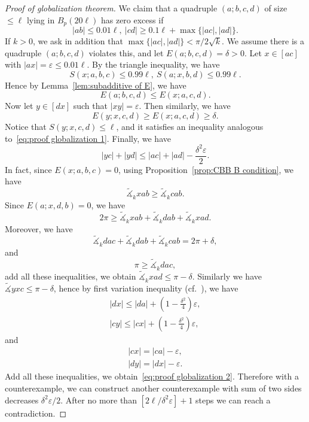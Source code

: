 \begin{proof}[Proof of globalization theorem]
    We claim that a quadruple $(a;b,c,d)$ of size $\leq\ell$ lying in $B_p(20\ell)$ has zero excess if
    \begin{equation}
        |ab|\leq 0.01\ell,\ |cd|\geq 0.1\ell+\max\{|ac|,|ad|\}.\label{eq:proof globalization 1}
    \end{equation}
    If $k>0$, we ask in addition that $\max\{|ac|,|ad|\}<\pi/2\sqrt{k}$.
    We assume there is a quadruple $(a;b,c,d)$ violates this, and let $E(a;b,c,d)=\delta>0$.
    Let $x\in[ac]$ with $|ax|=\varepsilon\leq 0.01\ell$.
    By the triangle inequality, we have
    \[S(x;a,b,c)\leq 0.99\ell,\ S(a;x,b,d)\leq 0.99\ell.\]
    Hence by Lemma~\ref{lem:subadditive of E}, we have
    \[E(a;b,c,d)\leq E(x;a,c,d).\]
    Now let $y\in[dx]$ such that $|xy|=\varepsilon$.
    Then similarly, we have
    \[E(y;x,c,d)\geq E(x;a,c,d)\geq\delta.\]
    Notice that $S(y;x,c,d)\leq\ell$, and it satisfies an inequality analogous to~\eqref{eq:proof globalization 1}.
    Finally, we have
    \begin{equation}
        |yc|+|yd|\leq|ac|+|ad|-\frac{\delta^2\varepsilon}{2}.\label{eq:proof globalization 2}
    \end{equation}
    In fact, since $E(x;a,b,c)=0$, using Proposition~\ref{prop:CBB B condition}, we have
    \[\tilde{\measuredangle}_kxab\geq\tilde{\measuredangle}_kcab.\]
    Since $E(a;x,d,b)=0$, we have
    \[2\pi\geq\tilde{\measuredangle}_kxab+\tilde{\measuredangle}_kdab+\tilde{\measuredangle}_kxad.\]
    Moreover, we have
    \[\tilde{\measuredangle}_kdac+\tilde{\measuredangle}_kdab+\tilde{\measuredangle}_kcab=2\pi+\delta,\]
    and
    \[\pi\geq\tilde{\measuredangle}_kdac,\]
    add all these inequalities, we obtain $\tilde{\measuredangle}_kxad\leq\pi-\delta$.
    Similarly we have $\tilde{\measuredangle}yxc\leq\pi-\delta$, hence by first variation inequality (cf.~\cite[6.7]{alexanderAlexandrovGeometry2024}), we have
    \begin{gather*}
        |dx|\leq|da|+\left(1-\frac{\delta^2}{4}\right)\varepsilon,\\
        |cy|\leq|cx|+\left(1-\frac{\delta^2}{4}\right)\varepsilon,
    \end{gather*}
    and
    \begin{gather*}
        |cx|=|ca|-\varepsilon,\\
        |dy|=|dx|-\varepsilon.
    \end{gather*}
    Add all these inequalities, we obtain~\eqref{eq:proof globalization 2}.
    Therefore with a counterexample, we can construct another counterexample with sum of two sides decreases $\delta^2\varepsilon/2$.
    After no more than $[2\ell/\delta^2\varepsilon]+1$ steps we can reach a contradiction.


\end{proof}
